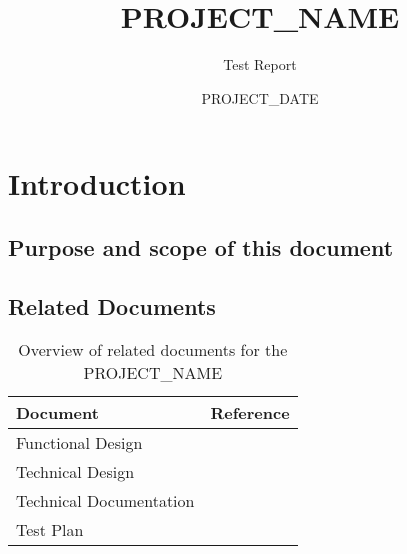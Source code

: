\documentclass[signature]{deltares_report}
\begin{document}
\pagestyle{empty}
\cleardoublepage
%

\newcommand{\ProgramName}{PROJECT_NAME\xspace}

\title{\ProgramName}
\subtitle{Test Report}
\classification{-}

\date{PROJECT_DATE}



\summary{}

\revieweri{}
\approvali{}

\disclaimer{}



\chapter{Introduction} 
\label{chapterIntroduction}

\section{Purpose and scope of this document} \label{sec:PurposeAndScope}


\section{Related Documents}
\label{sec:RelatedDocuments}
\bigskip
\begin{longtable}{|p{}|p{}|}
\caption{Overview of related documents for the \ProgramName \label{tab:RelatedDocuments}}\\	\hline
		\hline 
		\textbf{Document} & \textbf{Reference} \\
		\hline 
		\hline 
		Functional Design & \citep{PROJECT_NAME_FunctionalDesignPROJECT_YEAR} \\
		Technical Design & \citep{PROJECT_NAME_TechnicalDesignPROJECT_YEAR} \\
		Technical Documentation & \citep{PROJECT_NAME_TechnicalDocumentationPROJECT_YEAR} \\
		Test Plan & \citep{PROJECT_NAME_TestPlanPROJECT_YEAR} \\
    \hline			
\end{longtable}
\end{document}
